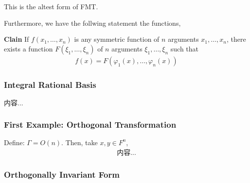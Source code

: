 \documentclass[Total.tex]{subfiles}
\begin{document}
				This is the altest form of FMT.
				
				Furthermore, we have the follwing statement the functions,
				
				\textbf{Clain} If $f(x_1,\dots,x_n)$ is any symmetric function of $n$ arguments $x_1,\dots,x_n$, there exists a function $F(\xi_1,\dots,\xi_n)$ of $n$ arguments $\xi_1,\dots,\xi_n$ such that
				\begin{gather*}
					f(x)=F(\varphi_1(x),\dots,\varphi_n(x))
				\end{gather*}
				\subsubsection{Integral Rational Basis}
				\begin{Def}
					内容...
				\end{Def}
				\subsubsection{First Example: Orthogonal Transformation}
				
				Define: $\Gamma=O(n)$. Then, take $x,y\in F^n$,
				\begin{gather*}
					内容...
				\end{gather*}
				\subsubsection{Orthogonally Invariant Form}
				
				
\end{document}
